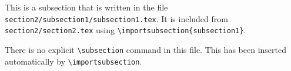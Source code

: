 This is a subsection that is written in the file
\texttt{section2/subsection1/subsection1.tex}.
It is included from \texttt{section2/section2.tex} using
\texttt{\textbackslash importsubsection\{subsection1\}}.

There is no explicit \texttt{\textbackslash subsection} command in this file.
This has been inserted automatically by \texttt{\textbackslash importsubsection}.
